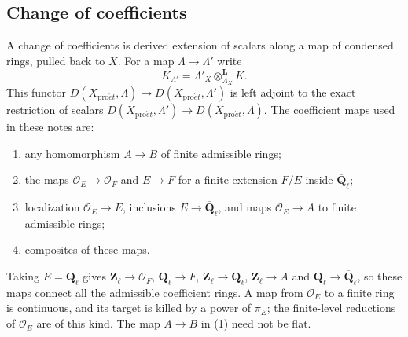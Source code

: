 \documentclass[11pt,a4paper]{article}
\numberwithin{equation}{section}
\theoremstyle{definition}
\theoremstyle{remark}
\newcommand{\Qbar}{\overline{\mathbf Q}_\ell}
\newcommand{\Ql}{\mathbf Q_\ell}
\newcommand{\Zl}{\mathbf Z_\ell}
\newcommand{\proet}{\mathrm{pro}\acute{e}t}
\begin{document}
\subsection{Change of coefficients}
\label{n:change}

A change of coefficients is derived extension of scalars along a map
of condensed rings, pulled back to $X$. For a map $\Lambda\to\Lambda'$ write
\[
 K_{\Lambda'}=\Lambda'_X\otimes^{\mathbf L}_{\Lambda_X}K.
\]
This functor $D(X_{\proet},\Lambda)\to D(X_{\proet},\Lambda')$ is left
adjoint to the exact restriction of scalars
$D(X_{\proet},\Lambda')\to D(X_{\proet},\Lambda)$.
The coefficient maps used in these notes are:
\begin{enumerate}
\item any homomorphism $A\to B$ of finite admissible rings;
\item the maps $\mathcal O_E\to\mathcal O_F$ and $E\to F$ for a
  finite extension $F/E$ inside $\Qbar$;
\item localization $\mathcal O_E\to E$, inclusions $E\to\Qbar$,
  and maps $\mathcal O_E\to A$ to finite admissible rings;
\item composites of these maps.
\end{enumerate}
Taking $E=\Ql$ gives $\Zl\to\mathcal O_F$, $\Ql\to F$, $\Zl\to\Ql$,
$\Zl\to A$ and $\Ql\to\Qbar$, so these maps connect all the admissible
coefficient rings. A map from $\mathcal O_E$ to a finite ring is
continuous, and its target is killed by a power of $\pi_E$; the
finite-level reductions of $\mathcal O_E$ are of this kind. The map
$A\to B$ in (1) need not be flat.
\end{document}

